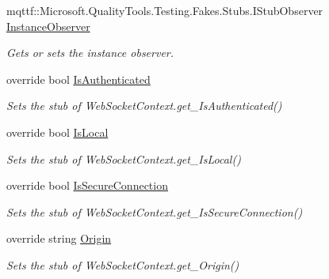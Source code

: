 \begin{DoxyCompactItemize}
mqttf\-::\-Microsoft.\-Quality\-Tools.\-Testing.\-Fakes.\-Stubs.\-I\-Stub\-Observer \hyperlink{class_system_1_1_net_1_1_web_sockets_1_1_fakes_1_1_stub_web_socket_context_a64c142e7afe3f19f197da68b73fffbd8}{Instance\-Observer}
\begin{DoxyCompactList}\small\item\em Gets or sets the instance observer.\end{DoxyCompactList}\item 
override bool \hyperlink{class_system_1_1_net_1_1_web_sockets_1_1_fakes_1_1_stub_web_socket_context_ad49834a6fbe3d80c61dcccdac9d7809f}{Is\-Authenticated}
\begin{DoxyCompactList}\small\item\em Sets the stub of Web\-Socket\-Context.\-get\-\_\-\-Is\-Authenticated()\end{DoxyCompactList}\item 
override bool \hyperlink{class_system_1_1_net_1_1_web_sockets_1_1_fakes_1_1_stub_web_socket_context_a58905654f76fff0a89d9fc4d375d2655}{Is\-Local}
\begin{DoxyCompactList}\small\item\em Sets the stub of Web\-Socket\-Context.\-get\-\_\-\-Is\-Local()\end{DoxyCompactList}\item 
override bool \hyperlink{class_system_1_1_net_1_1_web_sockets_1_1_fakes_1_1_stub_web_socket_context_aaa976d23aeb2183adefe7ba5f38bd999}{Is\-Secure\-Connection}
\begin{DoxyCompactList}\small\item\em Sets the stub of Web\-Socket\-Context.\-get\-\_\-\-Is\-Secure\-Connection()\end{DoxyCompactList}\item 
override string \hyperlink{class_system_1_1_net_1_1_web_sockets_1_1_fakes_1_1_stub_web_socket_context_ac39d9d3e1ba785579cead8267928feea}{Origin}
\begin{DoxyCompactList}\small\item\em Sets the stub of Web\-Socket\-Context.\-get\-\_\-\-Origin()\end{DoxyCompactList}\item 

\end{DoxyCompactItemize}

